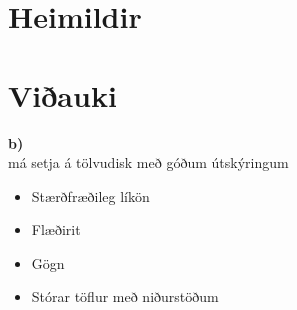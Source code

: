 \documentclass[a4paper,12pt]{article}
\begin{document}
\pagebreak
\section{Heimildir}



\pagebreak
\section{Viðauki}
\textbf{b)} \\


má setja á tölvudisk með góðum útskýringum
\begin{itemize}
\item Stærðfræðileg líkön
\item Flæðirit
\item Gögn
\item Stórar töflur með niðurstöðum
\end{itemize}
\end{document}
